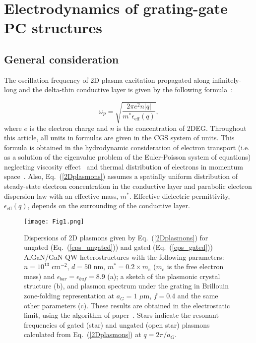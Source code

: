 \documentclass[%
 reprint,
 amsmath,amssymb,
 aps,
]{revtex4-2}
\begin{document}
\section{Electrodynamics of grating-gate PC structures}\label{Sec2}
\subsection{General consideration}

The oscillation frequency of 2D plasma excitation propagated along infinitely-long  and the delta-thin conductive layer is given by the following formula~\cite{Chaplik1985, Popov2011}:

\begin{equation}
\omega_{p}=\sqrt{\frac{2\pi e^2 n |q|}{m^{*}\epsilon_{\text{eff}}(q)}},
\label{2Dplasmons}
\end{equation}
where $e$ is the electron charge and $n$ is the concentration of 2DEG.
Throughout this article, all units in formulas are given in the CGS system of units.
This formula is obtained in the hydrodynamic consideration of electron transport (i.e. as a solution of the eigenvalue problem of the Euler-Poisson system of equations) neglecting viscosity effect~\cite{Rudin2010} and thermal distribution of electrons in momentum space~\cite{Totsuji1976, KorPRB2020}.
Also, Eq.~(\ref{2Dplasmons}) assumes a spatially uniform distribution of steady-state electron concentration in the conductive layer and parabolic electron dispersion law with an effective mass, $m^{*}$. Effective dielectric permittivity, $\epsilon_{\text{eff}}(q)$,  depends on the surrounding of the conductive layer.


\begin{figure*}[t!!!]
\texttt{[image: Fig1.png]}
 \caption{Dispersions of 2D plasmons given by Eq.~(\ref{2Dplasmons}) for ungated (Eq.~(\ref{eps_ungated})) and gated (Eq.~(\ref{eps_gated})) AlGaN/GaN QW heterostructures with the following parameters: $n=10^{13}$ cm$^{-2}$, $d=50$ nm, $m^{*}=0.2\times m_{e}$
 ($m_{e}$ is the free electron mass) and $\epsilon_{bar}=\epsilon_{buf}=8.9$ (a); a sketch of the plasmonic crystal structure (b), and plasmon spectrum under the grating in Brillouin zone-folding representation at $a_{G}=1$ $\mu$m, $f=0.4$ and the same other parameters (c). These results are obtained in the electrostatic limit, using the algorithm of paper~\cite{Popov1993}.
 Stars indicate the resonant frequencies of gated (star) and ungated (open star) plasmons calculated from Eq.~(\ref{2Dplasmons}) at $q=2\pi/a_{G}$.}
  \label{fig1}
\end{figure*}
\end{document}
